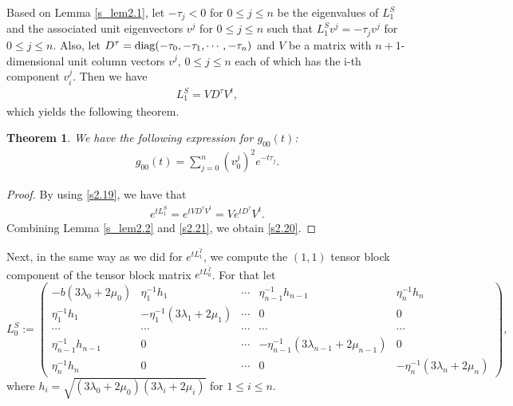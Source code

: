 \documentclass[a4paper,12pt]{article}
\newtheorem{Th}{Theorem}[section]
\newtheorem{a priori condition}[Th]{A priori condition}
\begin{document}
\noindent
Based on Lemma \ref{s_lem2.1}, let $-\tau_j<0$ for $0\leq j\leq n$ be the eigenvalues of $L_1^S$ and the associated unit eigenvectors $v^j$ for $0\leq j\leq n$ such that
$L_1^Sv^j=-\tau_j v^j$ for $0\leq j\leq n$.
Also, let
$D^{\tau}={\rm diag}(-\tau_0,-\tau_1,\cdots,-\tau_n)$ and 
$V$ be a matrix with $n+1$-dimensional unit column vectors $v^j,\,0\le j\le n$ each of which has the i-th component $v_i^j$. Then we have
\begin{equation}\label{s2.19}
\begin{aligned}
L_1^S=VD^{\tau}V^t,
\end{aligned}
\end{equation}
which yields the following theorem.
\begin{Th}\label{s_thm2.3}
We have the following expression for $g_{00}(t)$:
\begin{equation}\label{s2.20}
\begin{aligned}
g_{00}(t)=\sum_{j=0}^n(v_0^j)^2e^{-t\tau_j}.
\end{aligned}
\end{equation}
\end{Th}
\begin{proof}
By using \eqref{s2.19}, we have that
\begin{equation}\label{s2.21}
\begin{aligned}
e^{tL_1^S}=e^{tVD^{\tau}V^t}=Ve^{tD^{\tau}}V^t.
\end{aligned}
\end{equation}
Combining Lemma \ref{s_lem2.2} and \eqref{s2.21}, we obtain \eqref{s2.20}.

\end{proof}


Next, in the same way as we did for $e^{t L_1^{\tilde I}}$, we compute the $(1,1)$ tensor block component of the tensor block matrix $e^{t L_0^{\tilde I}}$. For that let
\begin{equation}\label{s2.22}
L_0^S:=
\begin{pmatrix}
                       -b(3\lambda_0+2\mu_0)
                       & \eta_1^{-1}h_1  & \cdots    &        \eta_{n-1}^{-1}h_{n-1}     &    \eta_n^{-1}h_n   \\

                              \eta_1^{-1}h_1                             & -\eta_1^{-1}(3\lambda_1+2\mu_1) & \cdots                  &          0  &   0         \\
            \cdots                                   & \cdots                   & \cdots     & \cdots           & \cdots                 \\
                               \eta_{n-1}^{-1}h_{n-1}                                & 0              & \cdots          &      -\eta_{n-1}^{-1}(3\lambda_{n-1}+2\mu_{n-1}) &      0         \\
                              \eta_n^{-1}h_n                              & 0              & \cdots        & 0            &   -\eta_n^{-1}(3\lambda_n+2\mu_n)
\end{pmatrix},
\end{equation}
where $h_i=\sqrt{(3\lambda_0+2\mu_0)(3\lambda_i+2\mu_i)} $ for $1\leq i \leq n$.
\end{document}
